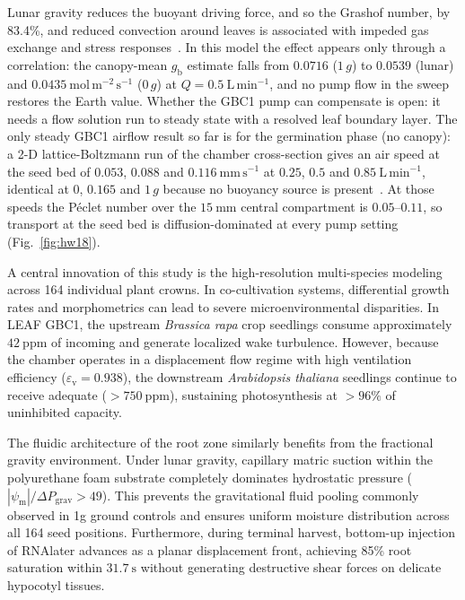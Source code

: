 \documentclass[pdflatex,sn-nature,iicol]{sn-jnl}
\begin{document}
Lunar gravity reduces the buoyant driving force, and so the Grashof number, by 83.4\%, and reduced convection around leaves is associated with impeded gas exchange and stress responses~\cite{porterfield2002biophysical,kitaya2001gravity}. In this model the effect appears only through a correlation: the canopy-mean $g_{\mathrm{b}}$ estimate falls from $0.0716$ ($1\,g$) to $0.0539$ (lunar) and $0.0435\ \mathrm{mol\,m^{-2}\,s^{-1}}$ ($0\,g$) at $Q = 0.5\ \mathrm{L\,min^{-1}}$, and no pump flow in the sweep restores the Earth value. Whether the GBC1 pump can compensate is open: it needs a flow solution run to steady state with a resolved leaf boundary layer. The only steady GBC1 airflow result so far is for the germination phase (no canopy): a 2-D lattice-Boltzmann run of the chamber cross-section gives an air speed at the seed bed of $0.053$, $0.088$ and $0.116\ \mathrm{mm\,s^{-1}}$ at $0.25$, $0.5$ and $0.85\ \mathrm{L\,min^{-1}}$, identical at $0$, $0.165$ and $1\,g$ because no buoyancy source is present~\cite{barker2026seedtwin}. At those speeds the P\'eclet number over the $15\ \mathrm{mm}$ central compartment is $0.05$--$0.11$, so transport at the seed bed is diffusion-dominated at every pump setting (Fig.~\ref{fig:hw18}).

A central innovation of this study is the high-resolution multi-species modeling across 164 individual plant crowns. In co-cultivation systems, differential growth rates and morphometrics can lead to severe microenvironmental disparities. In LEAF GBC1, the upstream \textit{Brassica rapa} crop seedlings consume approximately $42\ \mathrm{ppm}$ of incoming  and generate localized wake turbulence. However, because the chamber operates in a displacement flow regime with high ventilation efficiency ($\varepsilon_{\mathrm{v}} = 0.938$), the downstream \textit{Arabidopsis thaliana} seedlings continue to receive adequate  ($>750\ \mathrm{ppm}$), sustaining photosynthesis at $>96\%$ of uninhibited capacity.

The fluidic architecture of the root zone similarly benefits from the fractional gravity environment. Under lunar gravity, capillary matric suction within the polyurethane foam substrate completely dominates hydrostatic pressure ($|\psi_{\mathrm{m}}| / \Delta P_{\mathrm{grav}} > 49$). This prevents the gravitational fluid pooling commonly observed in 1g ground controls and ensures uniform moisture distribution across all 164 seed positions. Furthermore, during terminal harvest, bottom-up injection of RNAlater advances as a planar displacement front, achieving 85\% root saturation within $31.7\ \mathrm{s}$ without generating destructive shear forces on delicate hypocotyl tissues.
\end{document}
